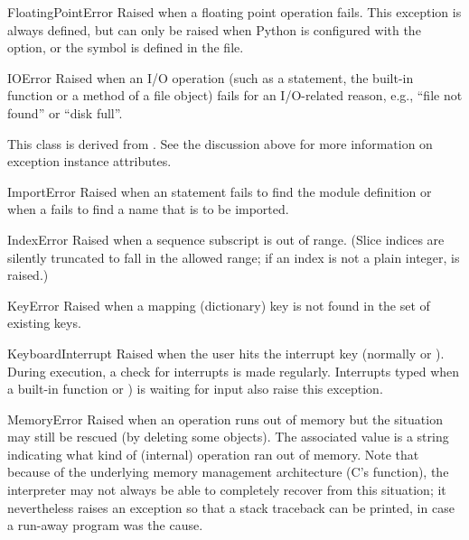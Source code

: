 \begin{excdesc}{FloatingPointError}
  Raised when a floating point operation fails.  This exception is
  always defined, but can only be raised when Python is configured
  with the  option, or the
   symbol is defined in the
   file.
\end{excdesc}

\begin{excdesc}{IOError}
  Raised when an I/O operation (such as a  statement,
  the built-in  function or a method of a file
  object) fails for an I/O-related reason, e.g., ``file not found'' or
  ``disk full''.

  This class is derived from .  See the
  discussion above for more information on exception instance
  attributes.
\end{excdesc}

\begin{excdesc}{ImportError}
  Raised when an  statement fails to find the module
  definition or when a  fails to find a
  name that is to be imported.
\end{excdesc}

\begin{excdesc}{IndexError}
  Raised when a sequence subscript is out of range.  (Slice indices are
  silently truncated to fall in the allowed range; if an index is not a
  plain integer,  is raised.)
\end{excdesc}

\begin{excdesc}{KeyError}
  Raised when a mapping (dictionary) key is not found in the set of
  existing keys.
\end{excdesc}

\begin{excdesc}{KeyboardInterrupt}
  Raised when the user hits the interrupt key (normally
   or ).  During execution, a check for
  interrupts is made regularly.
  Interrupts typed when a built-in function  or
  ) is waiting for input also raise this
  exception.
\end{excdesc}

\begin{excdesc}{MemoryError}
  Raised when an operation runs out of memory but the situation may
  still be rescued (by deleting some objects).  The associated value is
  a string indicating what kind of (internal) operation ran out of memory.
  Note that because of the underlying memory management architecture
  (C's  function), the interpreter may not
  always be able to completely recover from this situation; it
  nevertheless raises an exception so that a stack traceback can be
  printed, in case a run-away program was the cause.
\end{excdesc}

